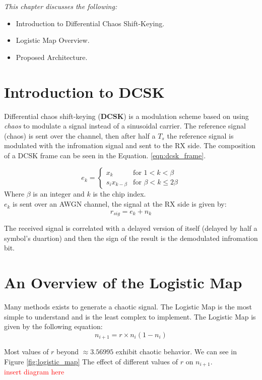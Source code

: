 \vfill
\textit{This chapter discusses the following:}
\begin{itemize}
    \item Introduction to Differential Chaos Shift-Keying.
    \item Logistic Map Overview.
    \item Proposed Architecture.
\end{itemize}
\vfill
\newpage

\section{Introduction to DCSK}
Differential chaos shift-keying (\textbf{DCSK}) is a modulation scheme based on using \textit{chaos} to modulate a signal
instead of a sinusoidal carrier. The reference signal (chaos) is sent over the channel, then after half a $T_s$ the reference signal is
modulated with the infromation signal and sent to the RX side. The composition of a DCSK frame
can be seen in the Equation. \ref{eqn:dcsk_frame}.

\begin{equation} \label{eqn:dcsk_frame}
    e_k =
        \begin{cases}
            x_k & \text{for } 1 < k < \beta\\
            s_i x_{k-\beta}  & \text{for } \beta < k \le 2\beta
        \end{cases}
\end{equation}
Where $\beta$ is an integer and $k$ is the chip index.\\

$e_k$ is sent over an AWGN channel, the signal at the RX side is given by:
\begin{equation}
    r_{sig} = e_k + n_k
\end{equation}

The received signal is correlated with a delayed version of itself (delayed by half a symbol's duartion) and then
the sign of the result is the demodulated infromation bit.

\section{An Overview of the Logistic Map}
Many methods exists to generate a chaotic signal. The Logistic Map is the most simple to understand and is the least complex to implement.
The Logistic Map is given by the following equation:
\begin{equation} \label{eqn:logistic_map}
    n_{i+1} = r \times n_i(1-n_i)
\end{equation}

Most values of $r$ beyond $\approx 3.56995$ exhibit chaotic behavior. We can see in Figure \ref{fig:logistic_map}
The effect of different values of $r$ on $n_{i+1}$.\\
\textcolor{red}{insert diagram here}\\

